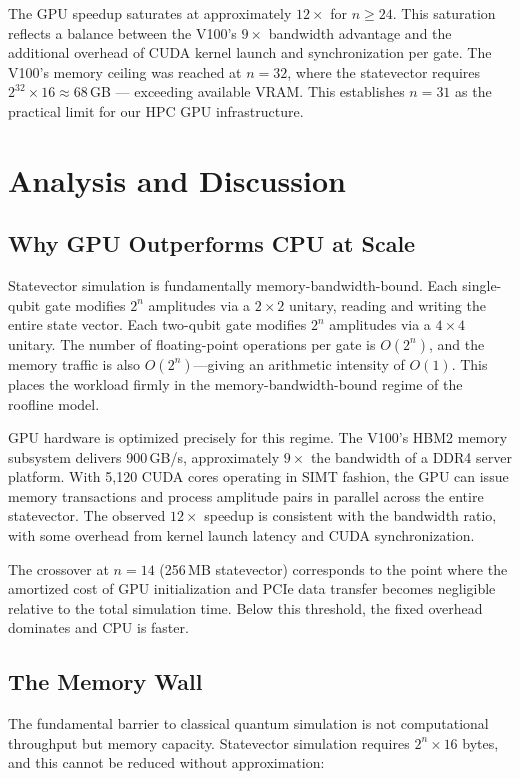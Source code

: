 \documentclass[sigconf, authorversion, nonacm]{acmart}
\begin{document}
The GPU speedup saturates at approximately $12\times$ for $n \geq 24$. This saturation reflects a balance between the V100's $9\times$ bandwidth advantage and the additional overhead of CUDA kernel launch and synchronization per gate. The V100's memory ceiling was reached at $n=32$, where the statevector requires $2^{32} \times 16 \approx 68$\,GB --- exceeding available VRAM. This establishes $n=31$ as the practical limit for our HPC GPU infrastructure.

\section{Analysis and Discussion}

\subsection{Why GPU Outperforms CPU at Scale}

Statevector simulation is fundamentally memory-bandwidth-bound. Each single-qubit gate modifies $2^n$ amplitudes via a $2 \times 2$ unitary, reading and writing the entire state vector. Each two-qubit gate modifies $2^n$ amplitudes via a $4 \times 4$ unitary. The number of floating-point operations per gate is $O(2^n)$, and the memory traffic is also $O(2^n)$---giving an arithmetic intensity of $O(1)$. This places the workload firmly in the memory-bandwidth-bound regime of the roofline model.

GPU hardware is optimized precisely for this regime. The V100's HBM2 memory subsystem delivers 900\,GB/s, approximately $9\times$ the bandwidth of a DDR4 server platform. With 5,120 CUDA cores operating in SIMT fashion, the GPU can issue memory transactions and process amplitude pairs in parallel across the entire statevector. The observed $12\times$ speedup is consistent with the bandwidth ratio, with some overhead from kernel launch latency and CUDA synchronization.

The crossover at $n=14$ (256\,MB statevector) corresponds to the point where the amortized cost of GPU initialization and PCIe data transfer becomes negligible relative to the total simulation time. Below this threshold, the fixed overhead dominates and CPU is faster.

\subsection{The Memory Wall}

The fundamental barrier to classical quantum simulation is not computational throughput but memory capacity. Statevector simulation requires $2^n \times 16$ bytes, and this cannot be reduced without approximation:
\end{document}
